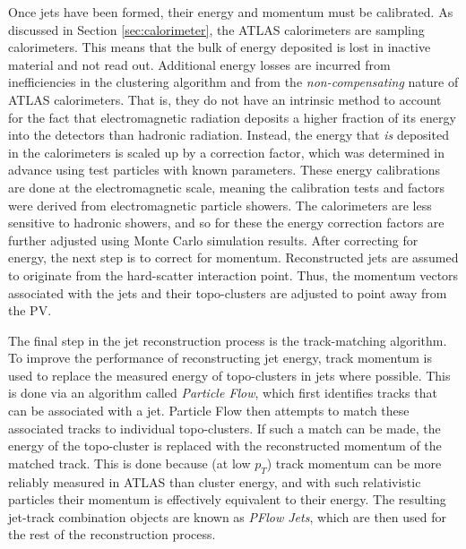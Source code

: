         Once jets have been formed, their energy and momentum must be calibrated.
        As discussed in Section \ref{sec:calorimeter}, the ATLAS calorimeters are sampling calorimeters.
        This means that the bulk of energy deposited is lost in inactive material and not read out.
        Additional energy losses are incurred from inefficiencies in the clustering algorithm and from the \textit{non-compensating} nature of ATLAS calorimeters.
        That is, they do not have an intrinsic method to account for the fact that electromagnetic radiation deposits a higher fraction of its energy into the detectors than hadronic radiation\cite{cell_clustering}.
        Instead, the energy that \textit{is} deposited in the calorimeters is scaled up by a correction factor,
            which was determined in advance using test particles with known parameters\cite{jet_energy_measurment}.
        These energy calibrations are done at the electromagnetic scale,
            meaning the calibration tests and factors were derived from electromagnetic particle showers.
        The calorimeters are less sensitive to hadronic showers,
            and so for these the energy correction factors are further adjusted using Monte Carlo simulation results.
        After correcting for energy, the next step is to correct for momentum.
        Reconstructed jets are assumed to originate from the hard-scatter interaction point.
        Thus, the momentum vectors associated with the jets and their topo-clusters are adjusted to point away from the PV.

        The final step in the jet reconstruction process is the track-matching algorithm.
        To improve the performance of reconstructing jet energy,
            track momentum is used to replace the measured energy of topo-clusters in jets where possible.
        This is done via an algorithm called \textit{Particle Flow},
            which first identifies tracks that can be associated with a jet.
        Particle Flow then attempts to match these associated tracks to individual topo-clusters.
        If such a match can be made, the energy of the topo-cluster is replaced with the reconstructed momentum of the matched track.
        This is done because (at low $p_T$) track momentum can be more reliably measured in ATLAS than cluster energy,
            and with such relativistic particles their momentum is effectively equivalent to their energy.
        The resulting jet-track combination objects are known as \textit{PFlow Jets},
            which are then used for the rest of the reconstruction process\cite{pflow}.

